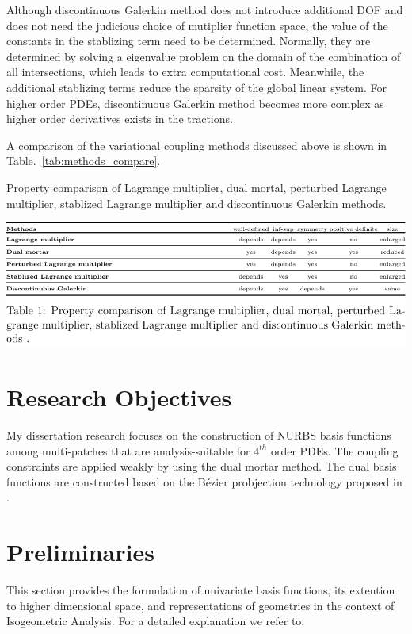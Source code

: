 \documentclass[preprint,12pt]{elsarticle}
\newcommand{\Bezier}{{B\'{e}zier} }
\theoremstyle{remark}
\begin{document}
Although discontinuous Galerkin method does not introduce additional DOF and does not need the judicious choice of mutiplier function space, the value of the constants in the stablizing term need to be determined. Normally, they are determined by solving a eigenvalue problem on the domain of the combination of all intersections, which leads to extra computational cost. Meanwhile, the additional stablizing terms reduce the sparsity of the global linear system. For higher order PDEs, discontinuous Galerkin method becomes more complex as higher order derivatives exists in the tractions.\par
A comparison of the variational coupling methods discussed above is shown in Table.~\ref{tab:methods_compare}.
\begin{table}
    \caption{Property comparison of Lagrange multiplier, dual mortal, perturbed Lagrange multiplier, stablized Lagrange multiplier and discontinuous Galerkin methods.}
	\centering
    \includegraphics[width=\linewidth]{methods_compare}\label{tab:methods_compare}
\end{table}
\section{Research Objectives}
My dissertation research focuses on the construction of NURBS basis functions among multi-patches that are analysis-suitable for $4^{th}$ order PDEs. The coupling constraints are applied weakly by using the dual mortar method. The dual basis functions are constructed based on the \Bezier probjection technology proposed in \cite{thomas2015bezier}. 
\section{Preliminaries}
This section provides the formulation of univariate basis functions, its extention to higher dimensional space, and representations of geometries in the context of Isogeometric Analysis. For a detailed explanation we refer to.
\end{document}
